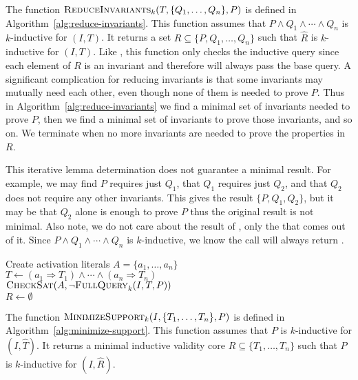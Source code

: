 The function $\textsc{ReduceInvariants}_k(T, \{Q_1, \ldots, Q_n\}, P)$ is defined in
Algorithm~\ref{alg:reduce-invariants}. This function assumes that $P
\land Q_1 \land \cdots \land Q_n$ is $k$-inductive for $(I, T)$. It
returns a set $R \subseteq \{P, Q_1, \ldots, Q_n\}$ such that
$\widehat R$ is $k$-inductive for $(I, T)$. Like \mink, this function
only checks the inductive query since each element of $R$ is an
invariant and therefore will always pass the base query. A significant
complication for reducing invariants is that some invariants may
mutually need each other, even though none of them is needed to prove
$P$. Thus in Algorithm~\ref{alg:reduce-invariants} we find a minimal
set of invariants needed to prove $P$, then we find a minimal set of
invariants to prove those invariants, and so on. We terminate when no
more invariants are needed to prove the properties in $R$. 

This iterative lemma determination does not guarantee a minimal result. For example, we may
find $P$ requires just $Q_1$, that $Q_1$ requires just $Q_2$, and that
$Q_2$ does not require any other invariants. This gives the result
$\{P, Q_1, Q_2\}$, but it may be that $Q_2$ alone is enough to prove
$P$ thus the original result is not minimal. Also note, we do not care
about the result of \checksat, only the \unsatcore that comes out of
it. Since $P \land Q_1 \land \cdots \land Q_n$ is $k$-inductive, we
know the \checksat call will always return \unsat.


\begin{algorithm}[t]
  Create activation literals $A = \{a_1, \ldots, a_n\}$ \\
  $T \leftarrow (a_1 \Rightarrow T_1) \land \cdots \land (a_n \Rightarrow T_n)$ \\
  $\textsc{CheckSat}(A, \neg\textsc{FullQuery}_k(I, T, P))$ \\
  $R \leftarrow \emptyset$ \\
\caption{$\minsupport_k(I, \{T_1, \ldots, T_n\}, P)$}
\label{alg:minimize-support}
\end{algorithm}

The function $\minsupport_k(I, \{T_1, \ldots, T_n\}, P)$ is defined in
Algorithm~\ref{alg:minimize-support}. This function assumes that $P$
is $k$-inductive for $(I, \widehat T)$. It returns a minimal inductive validity core $R \subseteq \{T_1, \ldots, T_n\}$ such that $P$ is
$k$-inductive for $(I, \widehat R)$.

